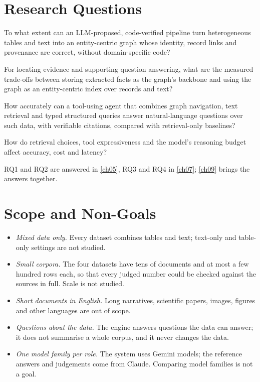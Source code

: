 \section{Research Questions}\label{sec:ch01-research-questions}

\begin{description}[style=nextline]
\item[RQ1 (construction)] To what extent can an LLM-proposed, code-verified pipeline turn heterogeneous tables and
text into an entity-centric graph whose identity, record links and provenance are correct, without domain-specific
code?
\item[RQ2 (representation)] For locating evidence and supporting question answering, what are the measured trade-offs
between storing extracted facts as the graph's backbone and using the graph as an entity-centric index over records and
text?
\item[RQ3 (query architecture)] How accurately can a tool-using agent that combines graph navigation, text retrieval
and typed structured queries answer natural-language questions over such data, with verifiable citations, compared
with retrieval-only baselines?
\item[RQ4 (design factors)] How do retrieval choices, tool expressiveness and the model's reasoning budget affect
accuracy, cost and latency?
\end{description}

RQ1 and RQ2 are answered in \cref{ch05}, RQ3 and RQ4 in \cref{ch07}; \cref{ch09} brings the answers together.

\section{Scope and Non-Goals}\label{sec:ch01-scope-and-non-goals}

\begin{itemize}[nosep]
\item \emph{Mixed data only.} Every dataset combines tables and text; text-only and table-only settings are not
studied.
\item \emph{Small corpora.} The four datasets have tens of documents and at most a few hundred rows each, so that every
judged number could be checked against the sources in full. Scale is not studied.
\item \emph{Short documents in English.} Long narratives, scientific papers, images, figures and other languages are
out of scope.
\item \emph{Questions about the data.} The engine answers questions the data can answer; it does not summarise a whole
corpus, and it never changes the data.
\item \emph{One model family per role.} The system uses Gemini models; the reference answers and judgements come from
Claude. Comparing model families is not a goal.
\end{itemize}

